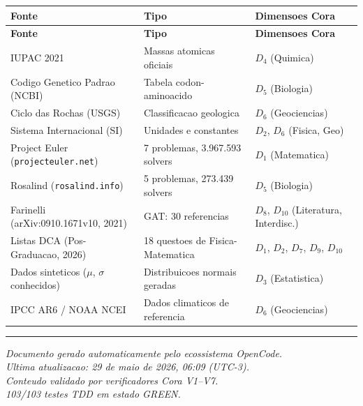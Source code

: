 \begin{longtable}{|p{3.0cm}|p{4.0cm}|p{4.5cm}|}
\hline
\textbf{Fonte} & \textbf{Tipo} & \textbf{Dimensoes Cora} \\
\hline
\endfirsthead
\hline
\textbf{Fonte} & \textbf{Tipo} & \textbf{Dimensoes Cora} \\
\hline
\endhead
\hline
\endfoot
IUPAC 2021 & Massas atomicas oficiais & $D_4$ (Quimica) \\
\hline
Codigo Genetico Padrao (NCBI) & Tabela codon-aminoacido & $D_5$ (Biologia) \\
\hline
Ciclo das Rochas (USGS) & Classificacao geologica & $D_6$ (Geociencias) \\
\hline
Sistema Internacional (SI) & Unidades e constantes & $D_2$, $D_6$ (Fisica, Geo) \\
\hline
Project Euler (\texttt{projecteuler.net}) & 7 problemas, 3.967.593 solvers & $D_1$ (Matematica) \\
\hline
Rosalind (\texttt{rosalind.info}) & 5 problemas, 273.439 solvers & $D_5$ (Biologia) \\
\hline
Farinelli (arXiv:0910.1671v10, 2021) & GAT: 30 referencias & $D_8$, $D_{10}$ (Literatura, Interdisc.) \\
\hline
Listas DCA (Pos-Graduacao, 2026) & 18 questoes de Fisica-Matematica & $D_1$, $D_2$, $D_7$, $D_9$, $D_{10}$ \\
\hline
Dados sinteticos ($\mu$, $\sigma$ conhecidos) & Distribuicoes normais geradas & $D_3$ (Estatistica) \\
\hline
IPCC AR6 / NOAA NCEI & Dados climaticos de referencia & $D_6$ (Geociencias) \\
\hline
\end{longtable}

\vspace{1cm}

\begin{center}
\rule{0.5\textwidth}{0.4pt}
\end{center}

\begin{flushright}
\textit{Documento gerado automaticamente pelo ecossistema OpenCode.}\\
\textit{Ultima atualizacao: 29 de maio de 2026, 06:09 (UTC-3).}\\
\textit{Conteudo validado por verificadores Cora V1--V7.}\\
\textit{103/103 testes TDD em estado GREEN.}
\end{flushright}

\endinput
